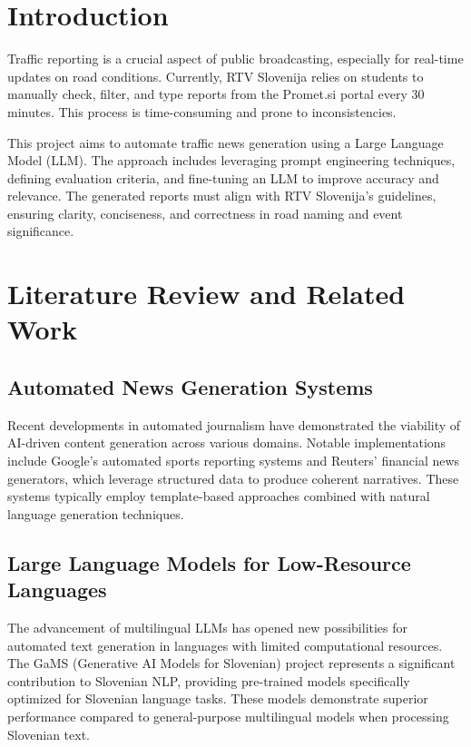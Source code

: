 \documentclass[fleqn,moreauthors,10pt]{ds_report}
\affiliation{\textit{Advisors: Slavko Žitnik}}
\begin{document}
\flushbottom 

\maketitle 

\thispagestyle{empty} 


\section*{Introduction}
	Traffic reporting is a crucial aspect of public broadcasting, especially for real-time updates on road conditions. Currently, RTV Slovenija relies on students to manually check, filter, and type reports from the Promet.si portal every 30 minutes. This process is time-consuming and prone to inconsistencies.

This project aims to automate traffic news generation using a Large Language Model (LLM). The approach includes leveraging prompt engineering techniques, defining evaluation criteria, and fine-tuning an LLM to improve accuracy and relevance. The generated reports must align with RTV Slovenija’s guidelines, ensuring clarity, conciseness, and correctness in road naming and event significance.

\section*{Literature Review and Related Work}

\subsection*{Automated News Generation Systems}
Recent developments in automated journalism have demonstrated the viability of AI-driven content generation across various domains. Notable implementations include Google's automated sports reporting systems and Reuters' financial news generators, which leverage structured data to produce coherent narratives. These systems typically employ template-based approaches combined with natural language generation techniques.

\subsection*{Large Language Models for Low-Resource Languages}
The advancement of multilingual LLMs has opened new possibilities for automated text generation in languages with limited computational resources. The GaMS (Generative AI Models for Slovenian) project represents a significant contribution to Slovenian NLP, providing pre-trained models specifically optimized for Slovenian language tasks. These models demonstrate superior performance compared to general-purpose multilingual models when processing Slovenian text.
\end{document}

